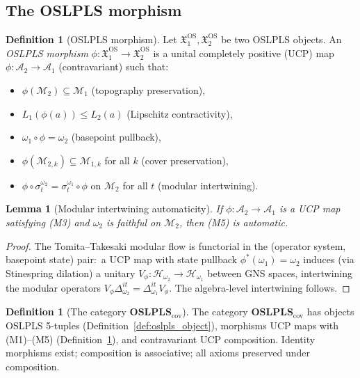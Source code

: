 \documentclass[11pt,a4paper]{article}
\theoremstyle{plain}
\newtheorem{lemma}[theorem]{Lemma}
\theoremstyle{definition}
\newtheorem{definition}[theorem]{Definition}
\newcommand{\Hilb}{\mathcal{H}}
\newcommand{\Acal}{\mathcal{A}}
\newcommand{\Mcal}{\mathcal{M}}
\newcommand{\OSLPLS}{\mathbf{OSLPLS}_{\mathrm{cov}}}
\newcommand{\Xfrak}{\mathfrak{X}^{\mathrm{OS}}}
\begin{document}
\subsection{The OSLPLS morphism}\label{sec:oslpls_morphisms}

\begin{definition}[OSLPLS morphism]\label{def:oslpls_morphism}
Let $\Xfrak_{1},\Xfrak_{2}$ be two OSLPLS objects. An \emph{OSLPLS
morphism} $\phi:\Xfrak_{1}\to\Xfrak_{2}$ is a unital completely
positive (UCP) map $\phi:\Acal_{2}\to\Acal_{1}$ (contravariant) such
that:
\begin{itemize}
\item[\textbf{(M1)}] $\phi(\Mcal_{2})\subseteq\Mcal_{1}$ (topography
preservation),
\item[\textbf{(M2)}] $L_{1}(\phi(a))\le L_{2}(a)$ (Lipschitz
contractivity),
\item[\textbf{(M3)}] $\omega_{1}\circ\phi=\omega_{2}$ (basepoint
pullback),
\item[\textbf{(M4)}] $\phi(\Mcal_{2,k})\subseteq\Mcal_{1,k}$ for all
$k$ (cover preservation),
\item[\textbf{(M5)}] $\phi\circ\sigma_{t}^{\omega_{2}}=\sigma_{t}^{\omega_{1}}
\circ\phi$ on $\Mcal_{2}$ for all $t$ (modular intertwining).
\end{itemize}
\end{definition}

\begin{lemma}[Modular intertwining automaticity]
\label{lem:modular_intertwining_automatic}
If $\phi:\Acal_{2}\to\Acal_{1}$ is a UCP map satisfying (M3) and
$\omega_{2}$ is faithful on $\Mcal_{2}$, then (M5) is automatic.
\end{lemma}

\begin{proof}
The Tomita--Takesaki modular flow is functorial in the (operator
system, basepoint state) pair:\ a UCP map with state pullback
$\phi^{*}(\omega_{1})=\omega_{2}$ induces (via Stinespring dilation)
a unitary $V_{\phi}:\Hilb_{\omega_{2}}\to\Hilb_{\omega_{1}}$ between
GNS spaces, intertwining the modular operators
$V_{\phi}\Delta_{\omega_{2}}^{it}=\Delta_{\omega_{1}}^{it}V_{\phi}$.
The algebra-level intertwining follows.
\end{proof}

\begin{definition}[The category $\OSLPLS$]\label{def:oslpls_category}
The category $\OSLPLS$ has objects OSLPLS 5-tuples
(Definition~\ref{def:oslpls_object}), morphisms UCP maps with
(M1)--(M5) (Definition~\ref{def:oslpls_morphism}), and contravariant
UCP composition. Identity morphisms exist; composition is
associative; all axioms preserved under composition.
\end{definition}
\end{document}
